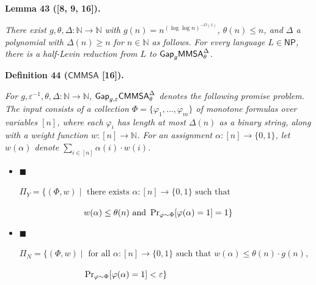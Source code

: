 



\par\medskip\noindent\textbf{
\textbf{Lemma 43}\textbf{ }([8, 9, 16])\textbf{.}
}\par



\emph{There exist $g,\theta,\Delta:\mathbb{N}\to\mathbb{N}$ with $g(n)=n^{(\log\log n)^{-O(1)}}$, $\theta(n)\leq n$, and $\Delta$ a polynomial with $\Delta(n)\geq n$ for $n\in\mathbb{N}$ as follows. For every language $L\in{\mathsf{NP}}$, there is a half-Levin reduction from $L$ to ${\sf Gap}_{g}{\mathsf{MMSA}}^{\Delta}_{\theta}$.}\par







\par\medskip\noindent\textbf{
\textbf{Definition 44}\textbf{ }(${\mathsf{CMMSA}}$ [16])\textbf{.}
}\par



\emph{For $g,\varepsilon^{-1},\theta,\Delta:\mathbb{N}\to\mathbb{N}$, ${\sf Gap}_{g,\varepsilon}{\mathsf{CMMSA}}^{\Delta}_{\theta}$ denotes the following promise problem. The input consists of a collection $\Phi=\{\varphi_{1},...,\varphi_{m}\}$ of monotone formulas over variables $[n]$, where each $\varphi_{i}$ has length at most $\Delta(n)$ as a binary string, along with a weight function $w:[n]\to\mathbb{N}$. For an assignment $\alpha:[n]\to\{0,1\}$, let $w(\alpha)$ denote $\sum_{i\in[n]}\alpha(i)\cdot w(i)$.}\par


\begin{itemize}


\item[] 
$\blacksquare$ 


$\Pi_{Y}=\{(\Phi,w)\mid\text{ there exists }\alpha:[n]\to\{0,1\}\text{ such that }$\emph{
}

$\phantom{x}\hskip 68.88867ptw(\alpha)\leq\theta(n)\text{ and }\Pr_{\varphi\sim\Phi}[\varphi(\alpha)=1]=1\}$\emph{}\par





\item[] 
$\blacksquare$ 


$\Pi_{N}=\{(\Phi,w)\mid\text{ for all }\alpha:[n]\to\{0,1\}\text{ such that }w(\alpha)\leq\theta(n)\cdot g(n)\text{, }$\emph{
}

$\phantom{x}\hskip 68.88867pt\Pr_{\varphi\sim\Phi}[\varphi(\alpha)=1]<\varepsilon\}$\emph{}\par





\end{itemize}



